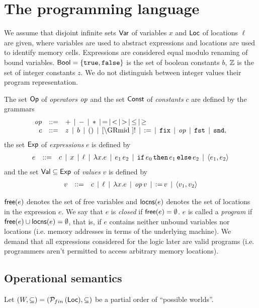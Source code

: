 \documentclass[12pt,a4paper]{article}
\begin{document}
\section{The programming language}

We assume that disjoint infinite sets $\mathsf{Var}$ of variables $x$ and $\mathsf{Loc}$ of locations $\ell$ are given, where
variables are used to abstract expressions and locations are used to identify memory cells.
Expressions are considered equal modulo renaming of bound variables. $\mathsf{Bool}=\{\mathtt{true},\mathtt{false}\}$ is
the set of boolean constants $b$, $\mathbb Z$ is the set of integer constants $z$. We do not distinguish
between integer values their program representation.

\begin{definition}[Expressions]
  The set $\mathsf{Op}$ of {\em operators} $\mathit{op}$ and the set $\mathsf{Const}$ of {\em constants} $c$ are defined by
  the grammars
  \[\GRbeg
  \op \GRis + \GRmid - \GRmid * \GRmid = \GRmid < \GRmid > \GRmid \le \GRmid \ge \\
  c \GRis z \GRmid b \GRmid \unit \GRmid \cref \GRmid ! \GRmid \assign \GRmid \fix \GRmid \op \GRmid \fst \GRmid \snd,
  \GRend\]
  the set $\mathsf{Exp}$ of {\em expressions} $e$ is defined by
  \[\begin{array}{rrlll}
  e & ::= & c \,\mid\, x \,\mid\, \ell \,\mid\, \lambda x.e \,\mid\, e_1\,e_2
  \,\mid\, \mathtt{if}\,e_0\,\mathtt{then}\,e_1\,\mathtt{else}\,e_2 \,\mid\, \langle e_1,e_2 \rangle
  \end{array}\]
  and the set $\mathsf{Val} \subseteq \mathsf{Exp}$ of {\em values} $v$ is defined by
  \[\begin{array}{rrlll}
  v & ::= & c \,\mid\, \ell \,\mid\, \lambda x.e \,\mid\, \mathit{op}\,v \,\mid\, \mathtt{:=}\,v \,\mid\, \langle v_1,v_2 \rangle
  \end{array}\]
\end{definition}

$\mathsf{free}(e)$ denotes the set of free variables and $\mathsf{locns}(e)$ denotes the set of locations in the expression $e$.
We say that $e$ is {\em closed} if $\mathsf{free}(e)=\emptyset$. $e$ is called a {\em program} if
$\mathsf{free}(e)\cup\mathsf{locns}(e)=\emptyset$, that is, if $e$ contains neither unbound variables nor locations (i.e.
memory addresses in terms of the underlying machine). We demand that all expressions considered for the
logic later are valid programs (i.e. programmers aren't permitted to access arbitrary memory locations).


\subsection{Operational semantics}

Let $(W,\subseteq) = (\mathcal{P}_{fin}\,(\mathsf{Loc}),\subseteq)$ be a partial order of ``possible worlds''.
\end{document}
